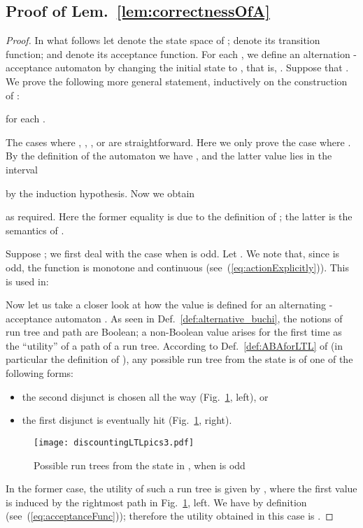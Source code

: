 \documentclass[a4paper,USenglish,numberwithinsect]{lipics}
\theoremstyle{definition}
\theoremstyle{remark}
\theoremstyle{plain}
\begin{document}
\subsection{Proof of Lem.~\ref{lem:correctnessOfA}}
\label{pf:lemcorrectnessOfA}
\begin{proof}
 In what follows
  let  denote the state space of ;
  denote its transition function;
and  denote its acceptance function.
For each ,  we define an alternation -acceptance automaton 
 by changing the initial
 state to , that is,
. Suppose
 that . 
 We prove the following more general statement, inductively on the
 construction of :

  for each .

  The cases where , , ,  or  are straightforward. Here we only prove the case where
 . 
 By the definition of the automaton  we have
 , and the latter value lies in the interval
 
 by the induction hypothesis. Now we obtain

 as required. Here the former equality is due to the definition of
 ; the latter is the semantics of .








   
  Suppose  ; we first deal with the case
 when  is odd. 
Let . 
We note that, since   is odd, the function
  is monotone and
 continuous (see~(\ref{eq:actionExplicitly})). This is used in:
  
Now let us take a closer look at how the value  is defined for an alternating
 -acceptance automaton . As seen in
 Def.~\ref{def:alternative_buchi}, the notions of run tree and path
 are Boolean; a non-Boolean value arises for the first time as the
 ``utility''  of a path  of a run tree. 
According to Def.~\ref{def:ABAforLTL} of 
  (in particular the definition of ),  any possible run tree 
 from the state  is of one of the following forms:
\begin{itemize}
 \item the second disjunct  is chosen all the way
       (Fig.~\ref{fig:untilRunTree}, left),
or
 \item the first disjunct  is eventually hit
       (Fig.~\ref{fig:untilRunTree}, right).
\end{itemize}
\begin{figure}[tbp] 
\texttt{[image: discountingLTLpics3.pdf]}
 \caption{Possible run trees from the state  in , when  is
 odd}
\label{fig:untilRunTree}
\end{figure}
In the former case, the utility
  of such a run tree 
 is given by
, 
where the first value  is induced by the
 rightmost path in Fig.~\ref{fig:untilRunTree}, left.  We have
 by definition
 (see~(\ref{eq:acceptanceFunc})); therefore the utility obtained in this
 case is .


\end{proof}
\end{document}
